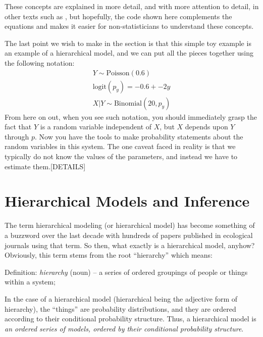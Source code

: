 These concepts are explained in more detail, and with more attention
to detail, in other texts such as \citet{casella_berger:2002}, but hopefully, the
code shown here complements the equations and makes it easier for
non-statisticians to understand these concepts.

The last point we wish
to make in the section is that this simple toy example is an example
of a hierarchical model, and we can put all the pieces together using
the following notation:
\begin{gather}
  Y \sim \text{Poisson}(0.6) \\
  \text{logit}(p_y) = -0.6 + -2y \\
  X|Y \sim \text{Binomial}(20, p_y)
\end{gather}
From here on out, when you see such notation, you should immediately
grasp the fact that $Y$ is a random variable independent of $X$, but
$X$ depends upon $Y$ through $p$. Now you have the tools to make
probability statements about the random variables in this system. The
one caveat faced in reality is that we typically do not know the
values of the parameters, and instead we have to estimate them.[DETAILS]









\section{Hierarchical Models and Inference}

The term hierarchical modeling (or hierarchical model) has become
something of a buzzword over the last decade with hundreds of papers
published in ecological journals using that term.  So then, what
exactly is a hierarchical model, anyhow? Obviously, this term stems
from the root ``hierarchy'' which means:

\vspace{.1in}

{\flushleft
Definition: {\it hierarchy} (noun) -- a series of ordered groupings of people or things within a system;
}

\vspace{.1in}

In the case of a hierarchical model (hierarchical being the adjective
form of hierarchy), the ``things'' are probability distributions, and
they are ordered according to their conditional probability structure.
Thus, a hierarchical model is {\it an ordered series of models,
  ordered by their conditional probability structure}.


